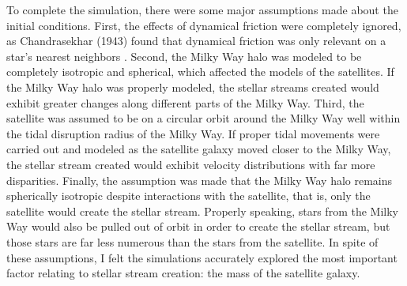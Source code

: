 \documentclass{article}
\begin{document}
To complete the simulation, there were some major assumptions made about the initial conditions. First, the effects of dynamical friction were completely ignored, as Chandrasekhar (1943) found that dynamical friction was only relevant on a star's nearest neighbors \cite{dynamicalFriction}. Second, the Milky Way halo was modeled to be completely isotropic and spherical, which affected the models of the satellites. If the Milky Way halo was properly modeled, the stellar streams created would exhibit greater changes along different parts of the Milky Way. Third, the satellite was assumed to be on a circular orbit around the Milky Way well within the tidal disruption radius of the Milky Way. If proper tidal movements were carried out and modeled as the satellite galaxy moved closer to the Milky Way, the stellar stream created would exhibit velocity distributions with far more disparities. Finally, the assumption was made that the Milky Way halo remains spherically isotropic despite interactions with the satellite, that is, only the satellite would create the stellar stream. Properly speaking, stars from the Milky Way would also be pulled out of orbit in order to create the stellar stream, but those stars are far less numerous than the stars from the satellite. In spite of these assumptions, I felt the simulations accurately explored the most important factor relating to stellar stream creation: the mass of the satellite galaxy. 



 
 
\end{document}
